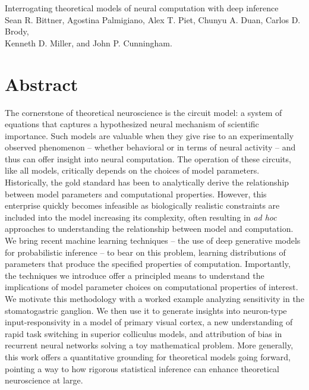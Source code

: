 \documentclass[11pt]{article}
\begin{document}
\medskip                        %

\thispagestyle{plain}
{\Large Interrogating theoretical models of neural computation with deep inference} \\
Sean R. Bittner, Agostina Palmigiano, Alex T. Piet, Chunyu A. Duan, Carlos D. Brody, \\
Kenneth D. Miller, and John P. Cunningham.

\linenumbers
\section{Abstract}
The cornerstone of theoretical neuroscience is the circuit model: a system of equations that captures a hypothesized neural mechanism of scientific importance.  
Such models are valuable when they give rise to an experimentally observed phenomenon -- whether behavioral or in terms of neural activity -- and thus can offer insight into neural computation.  
The operation of these circuits, like all models, critically depends on the choices of model parameters.  
Historically, the gold standard has been to analytically derive the relationship between model parameters and computational properties.  
However, this enterprise quickly becomes infeasible as biologically realistic constraints are included into the model increasing its complexity, often resulting in \emph{ad hoc} approaches to understanding the relationship between model and computation.  
We bring recent machine learning techniques -- the use of deep generative models for probabilistic inference -- to bear on this problem, learning distributions of parameters that produce the specified properties of computation.   
Importantly, the techniques we introduce offer a principled means to understand the implications of model parameter choices on computational properties of interest.  
We motivate this methodology with a worked example analyzing sensitivity in the stomatogastric ganglion.  
We then use it to generate insights into neuron-type input-responsivity in a model of primary visual cortex, a new understanding of rapid task switching in superior colliculus models, and attribution of bias in recurrent neural networks solving a toy mathematical problem. 
More generally, this work offers a quantitative grounding for theoretical models going forward, pointing a way to how rigorous statistical inference can enhance theoretical neuroscience at large.
\end{document}
